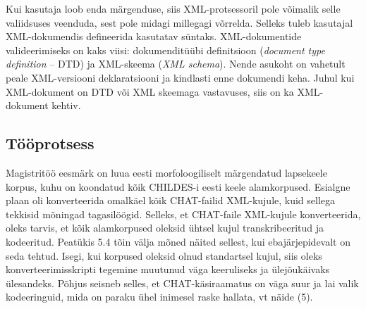 \documentclass[12pt]{article}
\begin{document}
Kui kasutaja loob enda märgenduse, siis XML-protsessoril pole võimalik selle valiidsuses veenduda, sest pole midagi millegagi võrrelda. Selleks tuleb kasutajal XML-dokumendis defineerida kasutatav süntaks. XML-dokumentide valideerimiseks on kaks viisi: dokumenditüübi definitsioon (\emph{document type definition} -- DTD) ja XML-skeema (\emph{XML schema}). Nende asukoht on vahetult peale XML-versiooni deklaratsiooni ja kindlasti enne dokumendi keha. Juhul kui XML-dokument on DTD või XML skeemaga vastavuses, siis on ka XML-dokument kehtiv. \citep{XML}

\subsection{Tööprotsess}

Magistritöö eesmärk on luua eesti morfoloogiliselt märgendatud lapsekeele korpus, kuhu on koondatud kõik CHILDES-i eesti keele alamkorpused. Esialgne plaan oli konverteerida omalkäel kõik CHAT-failid XML-kujule, kuid sellega tekkisid mõningad tagasilöögid. Selleks, et CHAT-faile XML-kujule konverteerida, oleks tarvis, et kõik alamkorpused oleksid ühtsel kujul transkribeeritud ja kodeeritud. Peatükis 5.4 tõin välja mõned näited sellest, kui ebajärjepidevalt on seda tehtud. Isegi, kui korpused oleksid olnud standartsel kujul, siis oleks konverteerimisskripti tegemine muutunud väga keeruliseks ja ülejõukäivaks ülesandeks. Põhjus seisneb selles, et CHAT-käsiraamatus on väga suur ja lai valik kodeeringuid, mida on paraku ühel inimesel raske hallata, vt näide (5).
\end{document}
